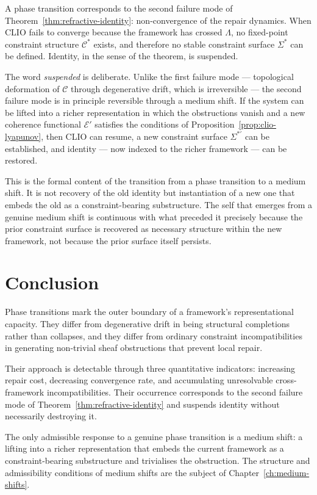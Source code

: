 \documentclass[11pt,openany]{book}
\begin{document}
A phase transition corresponds to the second failure mode
of Theorem~\ref{thm:refractive-identity}: non-convergence
of the repair dynamics.  When CLIO fails to converge
because the framework has crossed $\Lambda$, no fixed-point
constraint structure $\mathcal{C}^*$ exists, and therefore
no stable constraint surface $\Sigma^*$ can be defined.
Identity, in the sense of the theorem, is suspended.

The word \emph{suspended} is deliberate.  Unlike the
first failure mode --- topological deformation of
$\mathcal{C}$ through degenerative drift, which is
irreversible --- the second failure mode is in principle
reversible through a medium shift.  If the system can be
lifted into a richer representation in which the
obstructions vanish and a new coherence functional
$\mathcal{E}'$ satisfies the conditions of
Proposition~\ref{prop:clio-lyapunov}, then CLIO can
resume, a new constraint surface $\Sigma^{*\prime}$ can be
established, and identity --- now indexed to the richer
framework --- can be restored.

This is the formal content of the transition from a phase
transition to a medium shift.  It is not recovery of the
old identity but instantiation of a new one that embeds the
old as a constraint-bearing substructure.  The self that
emerges from a genuine medium shift is continuous with what
preceded it precisely because the prior constraint surface
is recovered as necessary structure within the new
framework, not because the prior surface itself persists.

\section{Conclusion}
\label{sec:conclusion-phase}

Phase transitions mark the outer boundary of a framework's
representational capacity.  They differ from degenerative
drift in being structural completions rather than
collapses, and they differ from ordinary constraint
incompatibilities in generating non-trivial sheaf
obstructions that prevent local repair.

Their approach is detectable through three quantitative
indicators: increasing repair cost, decreasing convergence
rate, and accumulating unresolvable cross-framework
incompatibilities.  Their occurrence corresponds to the
second failure mode of Theorem~\ref{thm:refractive-identity}
and suspends identity without necessarily destroying it.

The only admissible response to a genuine phase transition
is a medium shift: a lifting into a richer representation
that embeds the current framework as a constraint-bearing
substructure and trivialises the obstruction.  The
structure and admissibility conditions of medium shifts are
the subject of Chapter~\ref{ch:medium-shifts}.
\end{document}
